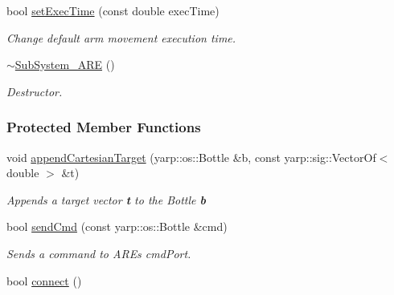 \begin{DoxyCompactItemize}
bool \hyperlink{group__icubclient__subsystems_a57b41efd7a13037bd383e4cdbd0b11ab}{set\+Exec\+Time} (const double exec\+Time)
\begin{DoxyCompactList}\small\item\em Change default arm movement execution time. \end{DoxyCompactList}\item 
\hyperlink{group__icubclient__subsystems_a7ffb007fd4a83e42d5a76d28087728b6}{$\sim$\+Sub\+System\+\_\+\+A\+RE} ()
\begin{DoxyCompactList}\small\item\em Destructor. \end{DoxyCompactList}\end{DoxyCompactItemize}
\subsubsection*{Protected Member Functions}
\begin{DoxyCompactItemize}
\item 
void \hyperlink{group__icubclient__subsystems_a3347647fc4edae6ce157586a7ae13ca5}{append\+Cartesian\+Target} (yarp\+::os\+::\+Bottle \&b, const yarp\+::sig\+::\+Vector\+Of$<$ double $>$ \&t)
\begin{DoxyCompactList}\small\item\em Appends a target vector {\bfseries t} to the Bottle {\bfseries b} \end{DoxyCompactList}\item 
bool \hyperlink{group__icubclient__subsystems_a5e8900944781979714a8cc5fb97f7ad4}{send\+Cmd} (const yarp\+::os\+::\+Bottle \&cmd)
\begin{DoxyCompactList}\small\item\em Sends a command to A\+RE\textquotesingle{}s cmd\+Port. \end{DoxyCompactList}\item 
bool \hyperlink{group__icubclient__subsystems_ab11c67c801f58eca84e8ef2941d4f2a8}{connect} ()
\end{DoxyCompactItemize}
